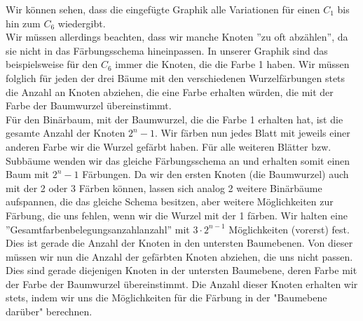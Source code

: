      Wir können sehen, dass die eingefügte Graphik alle Variationen für einen $C_1$ bis hin zum $C_6$  wiedergibt. \\
     Wir müssen allerdings beachten, dass wir manche Knoten ''zu oft abzählen'', da sie nicht in das Färbungsschema hineinpassen. In unserer Graphik sind das beispielsweise für den $C_6$  immer die Knoten, die die Farbe 1 haben. Wir müssen folglich für jeden der drei Bäume  mit den verschiedenen Wurzelfärbungen stets die Anzahl an Knoten abziehen, die eine Farbe erhalten würden, die mit der Farbe der Baumwurzel übereinstimmt.\\
     Für den Binärbaum, mit der Baumwurzel, die die Farbe 1 erhalten hat, ist die gesamte Anzahl der Knoten $2^n-1$. Wir färben nun jedes Blatt mit jeweils einer anderen Farbe wir die Wurzel gefärbt haben. Für alle weiteren Blätter bzw. Subbäume wenden wir das gleiche Färbungsschema an und erhalten somit einen Baum mit $2^n-1$ Färbungen. Da wir den ersten Knoten (die Baumwurzel) auch mit der 2 oder 3 Färben können, lassen sich analog 2 weitere Binärbäume aufspannen, die das gleiche Schema besitzen, aber weitere Möglichkeiten zur Färbung, die uns fehlen, wenn wir die Wurzel mit der 1 färben. Wir halten eine ''Gesamtfarbenbelegungsanzahlanzahl'' mit $3\cdot 2^{n-1}$ Möglichkeiten (vorerst) fest. Dies ist gerade die Anzahl der Knoten in den untersten Baumebenen.
     Von dieser müssen wir nun die Anzahl der gefärbten Knoten abziehen, die uns nicht passen. Dies sind gerade diejenigen Knoten in der untersten Baumebene, deren Farbe mit der Farbe der Baumwurzel übereinstimmt. Die Anzahl dieser Knoten erhalten wir stets, indem wir uns die Möglichkeiten für die Färbung in der "Baumebene darüber" berechnen.
     
